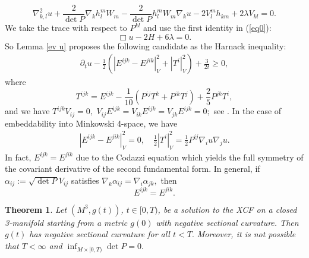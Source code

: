 \documentclass{amsart}
\newtheorem{theorem}{Theorem}
\theoremstyle{definition}
\theoremstyle{remark}
\numberwithin{equation}{section}
\begin{document}
\begin{equation*}
\nabla^2_{k,l}u+\frac{2}{\det P}\nabla_kh_l^mW_m-\frac{2}{\det P}h_l^mW_m\nabla_ku-2V_l^mh_{km}+2\lambda V_{kl}=0.
\end{equation*}
We take the trace with respect to $P^{kl}$ and use the first identity in (\ref{eq0}):
\begin{equation}\label{eq:5}
\Box u-2H+6\lambda=0.
\end{equation}
So Lemma \ref{ev u} proposes the following candidate as the  Harnack inequality:
 \begin{align}\label{harnack est}
\partial_tu-\frac{1}{2}\left(\left|E^{ijk}-E^{jik}\right|^2_V+\left|T^i\right|_V^2\right)+\frac{3}{2t}\geq 0,
\end{align}
 where
 \[T^{ijk}=E^{ijk}-\frac{1}{10}\left(P^{ij}T^k+P^{ik}T^j\right)+\frac{2}{5}P^{jk}T^i,\]
 and we have $T^{ijk}V_{ij}=0,$ $V_{ij}E^{ijk}=V_{ik}E^{ijk}=V_{jk}E^{ijk}=0;$ see \cite[Prop. 9]{Chowcross2002}. In the case of embeddability into Minkowski 4-space, we have
 \begin{align*}
\left|E^{ijk}-E^{jik}\right|^2_V=0,\quad\frac{1}{2}\left|T^i\right|_V^2=\frac{1}{2}P^{ij}\nabla_i u\nabla_ju.
 \end{align*}
In fact, $E^{ijk}=E^{jik}$ due to the Codazzi equation which yields the full symmetry of the covariant derivative of the second fundamental form. In general, if 
$\alpha_{ij}:=\sqrt{\det P}V_{ij}$ satisfies
$\nabla_k\alpha_{ij}=\nabla_i\alpha_{jk},$
then \[E^{ijk}=E^{jik}.\]
\begin{theorem}
Let $(M^3,g(t))$, $t\in [0,T)$, be a solution to the XCF on a closed 3-manifold starting from a metric $g(0)$ with negative sectional curvature. Then $g(t)$ has negative sectional curvature for all $t<T.$
Moreover, it is not possible that $T<\infty$ and $\inf_{M\times [0,T)}\det P=0.$
\end{theorem}
\end{document}
